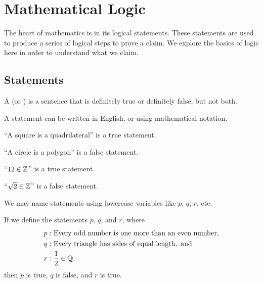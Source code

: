 \chapter{Mathematical Logic}
The heart of mathematics is in its logical statements. These statements are used to produce a series of logical steps to prove a claim. We explore the basics of logic here in order to understand what we claim.

\section{Statements}
\begin{definition}
    A  (or ) is a sentence that is definitely true or definitely false, but not both.
\end{definition}
A statement can be written in English, or using mathematical notation.

\begin{example}
    ``A square is a quadrilateral'' is a true statement.
\end{example}

\begin{example}
    ``A circle is a polygon'' is a false statement.
\end{example}

\begin{example}
    ``$12 \in \mathbb{Z}$'' is a true statement.
\end{example}

\begin{example}
    ``$\sqrt2 \in \mathbb{Z}$'' is a false statement.
\end{example}

We may name statements using lowercase variables like $p$, $q$, $r$, etc.
\begin{example}
    If we define the statements $p$, $q$, and $r$, where
    \begin{align*}
        p: &\ \text{Every odd number is one more than an even number},\\
        q: &\ \text{Every triangle has sides of equal length}, \text{ and}\\
        r: &\ \frac12 \in \mathbb{Q},
    \end{align*}
    then $p$ is true, $q$ is false, and $r$ is true.
\end{example}

